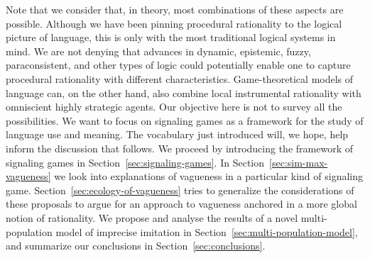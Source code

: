 \documentclass[a4paper]{article}
\begin{document}
Note that we consider that, in theory, most combinations of these aspects are possible.
Although we have been pinning procedural rationality to the logical picture of language, this is only with the most traditional logical systems in mind.
We are not denying that advances in dynamic, epistemic, fuzzy, paraconsistent, and other types of logic could potentially enable one to capture procedural rationality with different characteristics.
Game-theoretical models of language can, on the other hand, also combine local instrumental rationality with omniscient highly strategic agents.
Our objective here is not to survey all the possibilities.
We want to focus on signaling games as a framework for the study of language use and meaning.
The vocabulary just introduced will, we hope, help inform the discussion that follows.
We proceed by introducing the framework of signaling games in Section~\ref{sec:signaling-games}.
In Section~\ref{sec:sim-max-vagueness} we look into explanations of vagueness in a particular kind of signaling game.
Section~\ref{sec:ecology-of-vagueness} tries to generalize the considerations of these proposals to argue for an approach to vagueness anchored in a more global notion of rationality.
We propose and analyse the results of a novel multi-population model of imprecise imitation in Section~\ref{sec:multi-population-model}, and summarize our conclusions in Section~\ref{sec:conclusions}.


%
\end{document}
